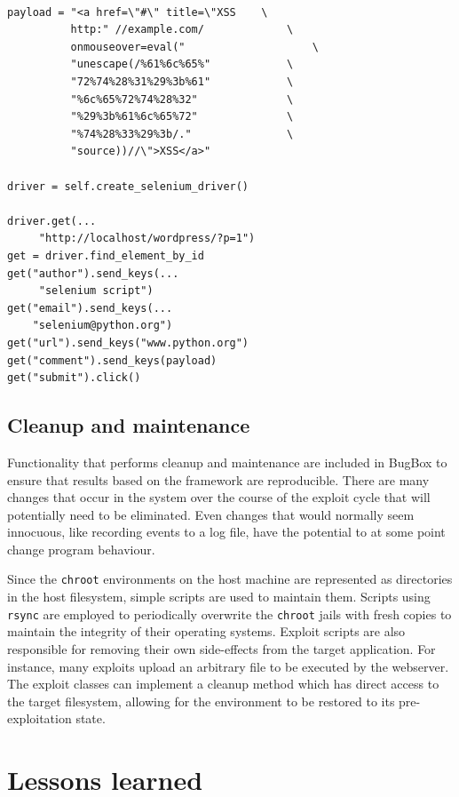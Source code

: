 \documentclass[letterpaper,twocolumn,10pt]{article}
\begin{document}
\begin{minipage}{\textwidth}
{\tt \footnotesize
\begin{lstlisting}
payload = "<a href=\"#\" title=\"XSS	\
          http:" //example.com/				\
          onmouseover=eval(" 					\
          "unescape(/%61%6c%65%"			\
          "72%74%28%31%29%3b%61"			\
          "%6c%65%72%74%28%32"				\
          "%29%3b%61%6c%65%72"				\
          "%74%28%33%29%3b/." 				\
          "source))//\">XSS</a>"

driver = self.create_selenium_driver()

driver.get(...
     "http://localhost/wordpress/?p=1")
get = driver.find_element_by_id
get("author").send_keys(...
     "selenium script")
get("email").send_keys(...
    "selenium@python.org")
get("url").send_keys("www.python.org")
get("comment").send_keys(payload)
get("submit").click()
\end{lstlisting}
}
\end{minipage}


\subsection {Cleanup and maintenance}


Functionality that performs cleanup and maintenance are included in BugBox to ensure that results based on the framework are reproducible. There are many changes that occur in the system over the course of the exploit cycle that will potentially need to be eliminated. Even changes that would normally seem innocuous, like recording events to a log file, have the potential to at some point change program behaviour.  

Since the {\tt chroot} environments on the host machine are represented as directories in the host filesystem, simple scripts are used to maintain them.  Scripts using {\tt rsync} are employed to periodically overwrite the {\tt chroot} jails with fresh copies to maintain the integrity of their operating systems. Exploit scripts are also responsible for removing their own side-effects from the target application. For instance, many exploits upload an arbitrary file to be executed by the webserver. The exploit classes can implement a cleanup method which has direct access to the target filesystem, allowing for the environment to be restored to its pre-exploitation state. 

\section {Lessons learned}
\end{document}
